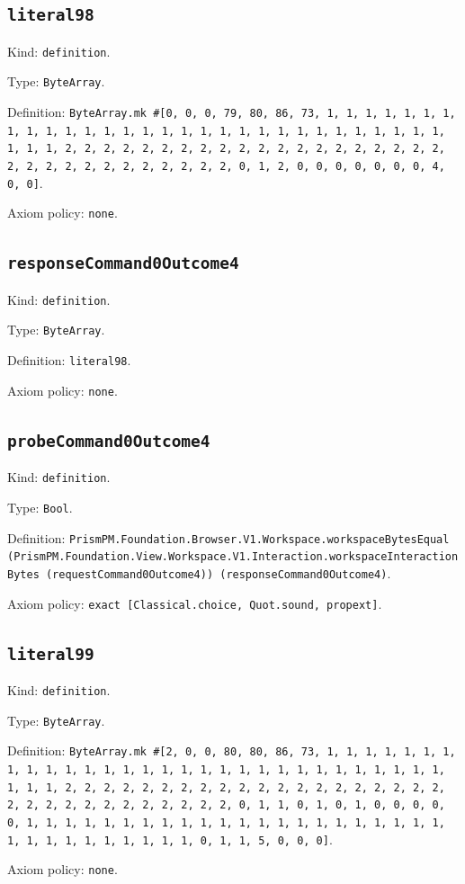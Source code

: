 \documentclass[11pt]{article}
\begin{document}
\subsection*{\texttt{literal98}}
\noindent Kind: \texttt{definition}.\par
\noindent Type: \texttt{ByteArray}.\par
\noindent Definition: \texttt{ByteArray.mk \#[0, 0, 0, 79, 80, 86, 73, 1, 1, 1, 1, 1, 1, 1, 1, 1, 1, 1, 1, 1, 1, 1, 1, 1, 1, 1, 1, 1, 1, 1, 1, 1, 1, 1, 1, 1, 1, 1, 1, 1, 2, 2, 2, 2, 2, 2, 2, 2, 2, 2, 2, 2, 2, 2, 2, 2, 2, 2, 2, 2, 2, 2, 2, 2, 2, 2, 2, 2, 2, 2, 2, 2, 0, 1, 2, 0, 0, 0, 0, 0, 0, 0, 4, 0, 0]}.\par
\noindent Axiom policy: \texttt{none}.\par
\subsection*{\texttt{responseCommand0Outcome4}}
\noindent Kind: \texttt{definition}.\par
\noindent Type: \texttt{ByteArray}.\par
\noindent Definition: \texttt{literal98}.\par
\noindent Axiom policy: \texttt{none}.\par
\subsection*{\texttt{probeCommand0Outcome4}}
\noindent Kind: \texttt{definition}.\par
\noindent Type: \texttt{Bool}.\par
\noindent Definition: \texttt{PrismPM.Foundation.Browser.V1.Workspace.workspaceBytesEqual (PrismPM.Foundation.View.Workspace.V1.Interaction.workspaceInteractionBytes (requestCommand0Outcome4)) (responseCommand0Outcome4)}.\par
\noindent Axiom policy: \texttt{exact [Classical.choice, Quot.sound, propext]}.\par
\subsection*{\texttt{literal99}}
\noindent Kind: \texttt{definition}.\par
\noindent Type: \texttt{ByteArray}.\par
\noindent Definition: \texttt{ByteArray.mk \#[2, 0, 0, 80, 80, 86, 73, 1, 1, 1, 1, 1, 1, 1, 1, 1, 1, 1, 1, 1, 1, 1, 1, 1, 1, 1, 1, 1, 1, 1, 1, 1, 1, 1, 1, 1, 1, 1, 1, 1, 2, 2, 2, 2, 2, 2, 2, 2, 2, 2, 2, 2, 2, 2, 2, 2, 2, 2, 2, 2, 2, 2, 2, 2, 2, 2, 2, 2, 2, 2, 2, 2, 0, 1, 1, 0, 1, 0, 1, 0, 0, 0, 0, 0, 1, 1, 1, 1, 1, 1, 1, 1, 1, 1, 1, 1, 1, 1, 1, 1, 1, 1, 1, 1, 1, 1, 1, 1, 1, 1, 1, 1, 1, 1, 1, 1, 0, 1, 1, 5, 0, 0, 0]}.\par
\noindent Axiom policy: \texttt{none}.\par
\end{document}
